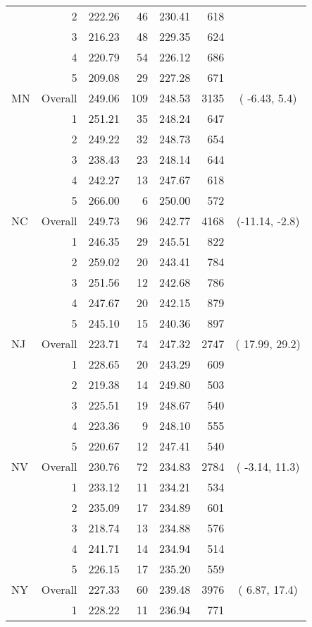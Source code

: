 \begin{longtable}{lrrr@{\extracolsep{.25cm}}rrc}
   & 2 & 222.26 &  46 & 230.41 & 618 &  \\ 
   & 3 & 216.23 &  48 & 229.35 & 624 &  \\ 
   & 4 & 220.79 &  54 & 226.12 & 686 &  \\ 
   & 5 & 209.08 &  29 & 227.28 & 671 &  \\ 
   \hline
MN & Overall & 249.06 & 109 & 248.53 & 3135 & ( -6.43,  5.4) \\ 
   & 1 & 251.21 &  35 & 248.24 & 647 &  \\ 
   & 2 & 249.22 &  32 & 248.73 & 654 &  \\ 
   & 3 & 238.43 &  23 & 248.14 & 644 &  \\ 
   & 4 & 242.27 &  13 & 247.67 & 618 &  \\ 
   & 5 & 266.00 &   6 & 250.00 & 572 &  \\ 
   \hline
NC & Overall & 249.73 &  96 & 242.77 & 4168 & (-11.14, -2.8) \\ 
   & 1 & 246.35 &  29 & 245.51 & 822 &  \\ 
   & 2 & 259.02 &  20 & 243.41 & 784 &  \\ 
   & 3 & 251.56 &  12 & 242.68 & 786 &  \\ 
   & 4 & 247.67 &  20 & 242.15 & 879 &  \\ 
   & 5 & 245.10 &  15 & 240.36 & 897 &  \\ 
   \hline
NJ & Overall & 223.71 &  74 & 247.32 & 2747 & ( 17.99, 29.2) \\ 
   & 1 & 228.65 &  20 & 243.29 & 609 &  \\ 
   & 2 & 219.38 &  14 & 249.80 & 503 &  \\ 
   & 3 & 225.51 &  19 & 248.67 & 540 &  \\ 
   & 4 & 223.36 &   9 & 248.10 & 555 &  \\ 
   & 5 & 220.67 &  12 & 247.41 & 540 &  \\ 
   \hline
NV & Overall & 230.76 &  72 & 234.83 & 2784 & ( -3.14, 11.3) \\ 
   & 1 & 233.12 &  11 & 234.21 & 534 &  \\ 
   & 2 & 235.09 &  17 & 234.89 & 601 &  \\ 
   & 3 & 218.74 &  13 & 234.88 & 576 &  \\ 
   & 4 & 241.71 &  14 & 234.94 & 514 &  \\ 
   & 5 & 226.15 &  17 & 235.20 & 559 &  \\ 
   \hline
NY & Overall & 227.33 &  60 & 239.48 & 3976 & (  6.87, 17.4) \\ 
   & 1 & 228.22 &  11 & 236.94 & 771 &  \\ 

\end{longtable}
